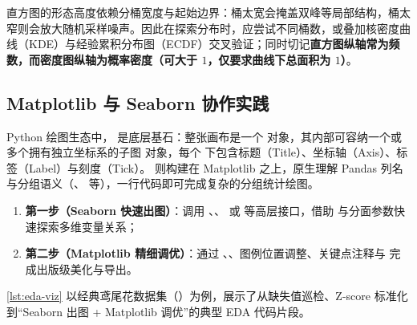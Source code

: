 
\begin{pitfall}[直方图分桶引发的视觉误导]\label{pit:hist-binning}
直方图的形态高度依赖分桶宽度与起始边界：桶太宽会掩盖双峰等局部结构，桶太窄则会放大随机采样噪声。因此在探索分布时，应尝试不同桶数，或叠加核密度曲线（KDE）与经验累积分布图（ECDF）交叉验证；同时切记\textbf{直方图纵轴常为频数，而密度图纵轴为概率密度（可大于 $1$，仅要求曲线下总面积为 $1$）}。
\end{pitfall}

\subsection{Matplotlib 与 Seaborn 协作实践}

Python 绘图生态中， 是底层基石：整张画布是一个  对象，其内部可容纳一个或多个拥有独立坐标系的子图  对象，每个  下包含标题（Title）、坐标轴（Axis）、标签（Label）与刻度（Tick）。 则构建在 Matplotlib 之上，原生理解 Pandas  列名与分组语义（、 等），一行代码即可完成复杂的分组统计绘图。

\begin{method}\label{met:viz-workflow}
\begin{enumerate}
  \item \textbf{第一步（Seaborn 快速出图）}：调用 、、 或  等高层接口，借助  与分面参数快速探索多维变量关系；
  \item \textbf{第二步（Matplotlib 精细调优）}：通过 、、图例位置调整、关键点注释与  完成出版级美化与导出。
\end{enumerate}
\end{method}

\cref{lst:eda-viz} 以经典鸢尾花数据集（）为例，展示了从缺失值巡检、Z-score 标准化到“Seaborn 出图 + Matplotlib 调优”的典型 EDA 代码片段。

